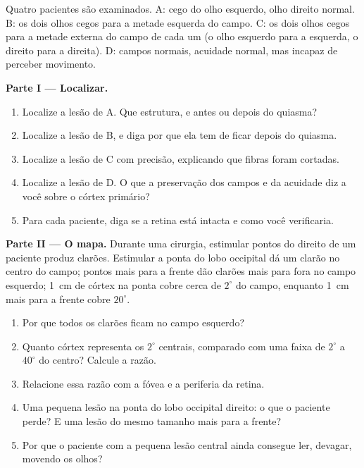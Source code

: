 \begin{problem}
\label{pb:g11:vision-and-brain:1}
Quatro pacientes são examinados. A: cego do olho esquerdo, olho direito
normal. B: os dois olhos cegos para a metade esquerda do campo. C: os
dois olhos cegos para a metade externa do campo de cada um (o olho
esquerdo para a esquerda, o direito para a direita). D: campos normais,
acuidade normal, mas incapaz de perceber movimento.

\medskip
\noindent\textbf{Parte I --- Localizar.}
\begin{enumerate}
  \item Localize a lesão de A. Que estrutura, e antes ou depois do
        quiasma?
  \item Localize a lesão de B, e diga por que ela tem de ficar depois
        do quiasma.
  \item Localize a lesão de C com precisão, explicando que fibras
        foram cortadas.
  \item Localize a lesão de D. O que a preservação dos campos e da
        acuidade diz a você sobre o córtex primário?
  \item Para cada paciente, diga se a retina está intacta e como você
        verificaria.
\end{enumerate}

\medskip
\noindent\textbf{Parte II --- O mapa.}
Durante uma cirurgia, estimular pontos do  direito de um
paciente produz clarões. Estimular a ponta do lobo occipital dá um
clarão no centro do campo; pontos mais para a frente dão clarões mais
para fora no campo esquerdo; \qty{1}{cm} de córtex na ponta cobre cerca
de $2^\circ$ do campo, enquanto \qty{1}{cm} mais para a frente cobre
$20^\circ$.
\begin{enumerate}[resume]
  \item Por que todos os clarões ficam no campo esquerdo?
  \item Quanto córtex representa os $2^\circ$ centrais, comparado com
        uma faixa de $2^\circ$ a $40^\circ$ do centro? Calcule a razão.
  \item Relacione essa razão com a fóvea e a periferia da retina.
  \item Uma pequena lesão na ponta do lobo occipital direito: o que o
        paciente perde? E uma lesão do mesmo tamanho mais para a frente?
  \item Por que o paciente com a pequena lesão central ainda consegue
        ler, devagar, movendo os olhos?
\end{enumerate}


\end{problem}
